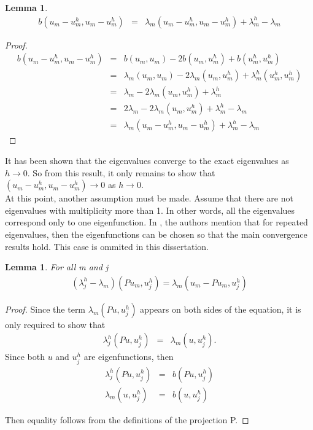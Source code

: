 \documentclass[../../main.tex]{subfiles}
\begin{document}
\newtheorem{Lem_5}[Lem_1]{Lemma} \label{Lem_5}
\begin{Lem_5}
	\begin{eqnarray*}
		b(u_{m}-u_{m}^{h},u_{m}-u_{m}^{h}) &=& \lambda_{m}( u_{m}-u_{m}^{h},u_{m}-u_{m}^{h} ) + \lambda_{m}^{h} - \lambda_{m}
		\end{eqnarray*}
\end{Lem_5}
\begin{proof}
	\begin{eqnarray*}
		b(u_{m}-u_{m}^{h},u_{m}-u_{m}^{h}) &=& b(u_{m},u_{m}) - 2b(u_{m},u^{h}_{m}) + b(u^{h}_{m},u^{h}_{m}) \\
										&=& \lambda_{m} ( u_{m}, u_{m} ) - 2\lambda_{m} ( u_{m}, u^{h}_{m} ) + \lambda_{m}^{h}( u_{m}^{h},u_{m}^{h} )\\
										&=&  \lambda_{m} - 2\lambda_{m} ( u_{m}, u^{h}_{m} ) + \lambda_{m}^{h} \\
										&=& 2\lambda_{m} - 2\lambda_{m} ( u_{m}, u^{h}_{m} ) + \lambda_{m}^{h} - \lambda_{m}\\
										&=& \lambda_{m}( u_{m}-u_{m}^{h},u_{m}-u_{m}^{h}) + \lambda_{m}^{h} - \lambda_{m}
		\end{eqnarray*}
\end{proof}

It has been shown that the eigenvalues converge to the exact eigenvalues as $h \rightarrow 0$. So from this result, it only remains to show that $( u_{m}-u_{m}^{h},u_{m}-u_{m}^{h}) \rightarrow 0$ as $h \rightarrow 0$.\\

At this point, another assumption must be made. Assume that there are not eigenvalues with multiplicity more than 1. In other words, all the eigenvalues correspond only to one eigenfunction. In \cite{SF73}, the authors mention that for repeated eigenvalues, then the eigenfunctions can be chosen so that the main convergence results hold. This case is ommited in this dissertation.\\

\newtheorem{Lem_6}[Lem_1]{Lemma} \label{Lem_6}
\begin{Lem_6}
	For all m and j
	\begin{eqnarray*}
	(\lambda_{j}^{h} - \lambda_{m}) ( Pu_{m}, u_{j}^{h}) = \lambda_{m} ( u_{m}-Pu_{m},u_{j}^{h} )
	\end{eqnarray*}
\end{Lem_6}
\begin{proof}
	Since the term $\lambda_{m}( Pu,u^{h}_{j})$ appears on both sides of the equation, it is only required to show that
	\begin{eqnarray*}
		\lambda_{j}^{h}( Pu, u_{j}^{h} ) &=& \lambda_{m} ( u, u_{j}^{h} ).	
	\end{eqnarray*}
	Since both $u$ and $u_{j}^{h}$ are eigenfunctions, then
	\begin{eqnarray*}
		\lambda_{j}^{h}( Pu, u_{j}^{h} ) &=& b(Pu,u_{j}^{h})\\
		\lambda_{m} ( u, u_{j}^{h} ) &=& b(u,u_{j}^{h})
	\end{eqnarray*}

	Then equality follows from the definitions of the projection P.
\end{proof}
\end{document}
